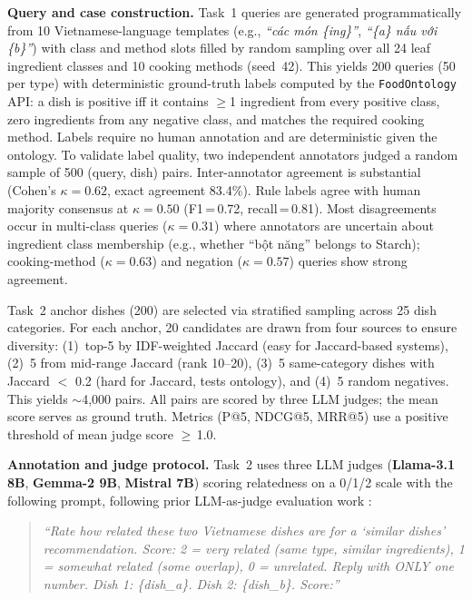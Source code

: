 \textbf{Query and case construction.}
Task~1 queries are generated programmatically from 10 Vietnamese-language templates (e.g., \textit{``các món \{ing\}''}, \textit{``\{a\} nấu với \{b\}''}) with class and method slots filled by random sampling over all 24 leaf ingredient classes and 10 cooking methods (seed~42). This yields 200 queries (50 per type) with deterministic ground-truth labels computed by the \texttt{FoodOntology} API: a dish is positive iff it contains $\geq$1 ingredient from every positive class, zero ingredients from any negative class, and matches the required cooking method. Labels require no human annotation and are deterministic given the ontology. To validate label quality, two independent annotators judged a random sample of 500 (query, dish) pairs. Inter-annotator agreement is substantial (Cohen's $\kappa = 0.62$, exact agreement 83.4\%). Rule labels agree with human majority consensus at $\kappa = 0.50$ (F1\,=\,0.72, recall\,=\,0.81). Most disagreements occur in multi-class queries ($\kappa = 0.31$) where annotators are uncertain about ingredient class membership (e.g., whether ``bột năng'' belongs to Starch); cooking-method ($\kappa = 0.63$) and negation ($\kappa = 0.57$) queries show strong agreement.

Task~2 anchor dishes (200) are selected via stratified sampling across 25 dish categories. For each anchor, 20 candidates are drawn from four sources to ensure diversity: (1)~top-5 by IDF-weighted Jaccard (easy for Jaccard-based systems), (2)~5 from mid-range Jaccard (rank 10--20), (3)~5 same-category dishes with Jaccard $<$ 0.2 (hard for Jaccard, tests ontology), and (4)~5 random negatives. This yields ${\sim}$4{,}000 pairs. All pairs are scored by three LLM judges; the mean score serves as ground truth. Metrics (P@5, NDCG@5, MRR@5) use a positive threshold of mean judge score $\geq$\,1.0.

\textbf{Annotation and judge protocol.}
Task~2 uses three LLM judges (\textbf{Llama-3.1 8B}, \textbf{Gemma-2 9B}, \textbf{Mistral 7B}) scoring relatedness on a 0/1/2 scale with the following prompt, following prior LLM-as-judge evaluation work \cite{zheng2023judge, liu2023geval}:

\begin{quote}
\small
\textit{``Rate how related these two Vietnamese dishes are for a `similar dishes' recommendation. Score: 2 = very related (same type, similar ingredients), 1 = somewhat related (some overlap), 0 = unrelated. Reply with ONLY one number. Dish 1: \{dish\_a\}. Dish 2: \{dish\_b\}. Score:''}
\end{quote}

